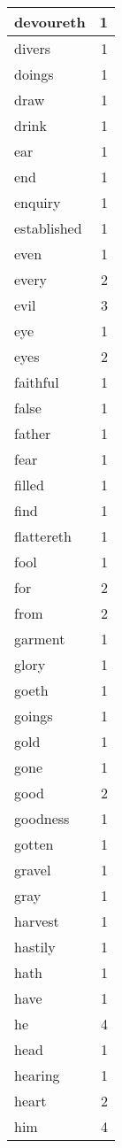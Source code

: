 \begin{center}
\begin{longtable}{l|r}
devoureth & 1\\ \hline 
divers & 1\\ \hline 
doings & 1\\ \hline 
draw & 1\\ \hline 
drink & 1\\ \hline 
ear & 1\\ \hline 
end & 1\\ \hline 
enquiry & 1\\ \hline 
established & 1\\ \hline 
even & 1\\ \hline 
every & 2\\ \hline 
evil & 3\\ \hline 
eye & 1\\ \hline 
eyes & 2\\ \hline 
faithful & 1\\ \hline 
false & 1\\ \hline 
father & 1\\ \hline 
fear & 1\\ \hline 
filled & 1\\ \hline 
find & 1\\ \hline 
flattereth & 1\\ \hline 
fool & 1\\ \hline 
for & 2\\ \hline 
from & 2\\ \hline 
garment & 1\\ \hline 
glory & 1\\ \hline 
goeth & 1\\ \hline 
goings & 1\\ \hline 
gold & 1\\ \hline 
gone & 1\\ \hline 
good & 2\\ \hline 
goodness & 1\\ \hline 
gotten & 1\\ \hline 
gravel & 1\\ \hline 
gray & 1\\ \hline 
harvest & 1\\ \hline 
hastily & 1\\ \hline 
hath & 1\\ \hline 
have & 1\\ \hline 
he & 4\\ \hline 
head & 1\\ \hline 
hearing & 1\\ \hline 
heart & 2\\ \hline 
him & 4\\ \hline 

\end{longtable}
\end{center}
